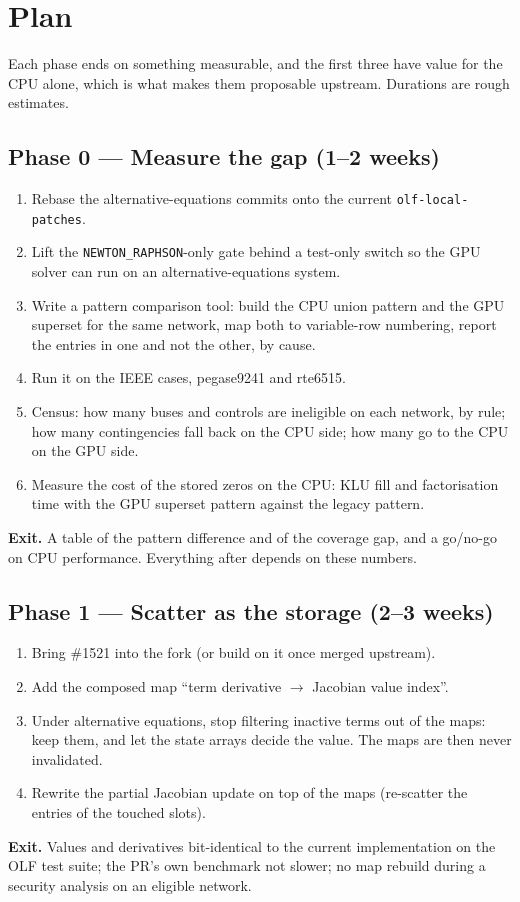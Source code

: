 \documentclass[11pt,a4paper]{article}
\newcommand{\code}[1]{\texttt{\small #1}}
\begin{document}
\section{Plan}

Each phase ends on something measurable, and the first three have value for the CPU
alone, which is what makes them proposable upstream. Durations are rough estimates.

\subsection*{Phase 0 --- Measure the gap \hfill (1--2 weeks)}
\begin{enumerate}
\item Rebase the alternative-equations commits onto the current \code{olf-local-patches}.
\item Lift the \code{NEWTON\_RAPHSON}-only gate behind a test-only switch so the GPU
      solver can run on an alternative-equations system.
\item Write a pattern comparison tool: build the CPU union pattern and the GPU superset
      for the same network, map both to variable-row numbering, report the entries in
      one and not the other, by cause.
\item Run it on the IEEE cases, pegase9241 and rte6515.
\item Census: how many buses and controls are ineligible on each network, by rule; how
      many contingencies fall back on the CPU side; how many go to the CPU on the GPU
      side.
\item Measure the cost of the stored zeros on the CPU: KLU fill and factorisation time
      with the GPU superset pattern against the legacy pattern.
\end{enumerate}
\textbf{Exit.} A table of the pattern difference and of the coverage gap, and a go/no-go
on CPU performance. Everything after depends on these numbers.

\subsection*{Phase 1 --- Scatter as the storage \hfill (2--3 weeks)}
\begin{enumerate}
\item Bring \#1521 into the fork (or build on it once merged upstream).
\item Add the composed map ``term derivative $\to$ Jacobian value index''.
\item Under alternative equations, stop filtering inactive terms out of the maps: keep
      them, and let the state arrays decide the value. The maps are then never
      invalidated.
\item Rewrite the partial Jacobian update on top of the maps (re-scatter the entries of
      the touched slots).
\end{enumerate}
\textbf{Exit.} Values and derivatives bit-identical to the current implementation on the
OLF test suite; the PR's own benchmark not slower; no map rebuild during a security
analysis on an eligible network.
\end{document}
